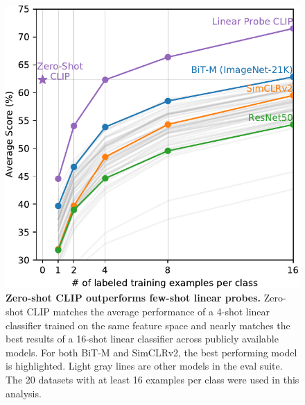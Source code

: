 \documentclass{article}
\begin{document}
\begin{figure}[t]
\begin{center}
\centerline{\includegraphics[width=1.0\columnwidth]{zs-clip-vs-fewshot.pdf}}
\caption{\textbf{Zero-shot CLIP outperforms few-shot linear probes.} Zero-shot CLIP matches the average performance of a 4-shot linear classifier trained on the same feature space and nearly matches the best results of a 16-shot linear classifier across publicly available models. For both BiT-M and SimCLRv2, the best performing model is highlighted. Light gray lines are other models in the eval suite. The 20 datasets with at least 16 examples per class were used in this analysis.}
\label{zeroshot_vs_fewshot}
\end{center}
\vspace{-2em}
\end{figure}
\end{document}
